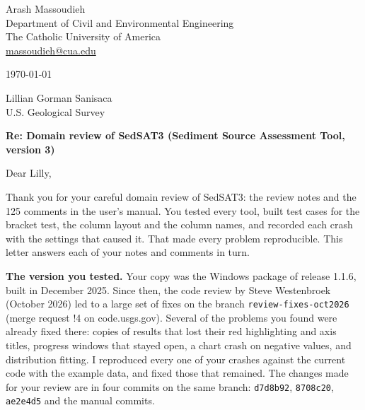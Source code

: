 \documentclass[11pt]{article}
\newcommand{\code}[1]{\texttt{#1}}
\newcommand{\commit}[1]{\texttt{#1}}
\begin{document}
\sloppy
\setlength{\emergencystretch}{3em}

\begin{flushleft}
Arash Massoudieh\\
Department of Civil and Environmental Engineering\\
The Catholic University of America\\
\href{mailto:massoudieh@cua.edu}{massoudieh@cua.edu}

\medskip
\today

\medskip
Lillian Gorman Sanisaca\\
U.S. Geological Survey
\end{flushleft}

\textbf{Re: Domain review of SedSAT3 (Sediment Source Assessment Tool, version 3)}

Dear Lilly,

Thank you for your careful domain review of SedSAT3: the review notes and the
125 comments in the user's manual. You tested every tool, built test cases for
the bracket test, the column layout and the column names, and recorded each
crash with the settings that caused it. That made every problem reproducible.
This letter answers each of your notes and comments in turn.

\textbf{The version you tested.} Your copy was the Windows package of release
1.1.6, built in December 2025. Since then, the code review by Steve Westenbroek
(October 2026) led to a large set of fixes on the branch
\code{review-fixes-oct2026} (merge request !4 on code.usgs.gov). Several of the
problems you found were already fixed there: copies of results that lost their
red highlighting and axis titles, progress windows that stayed open, a chart
crash on negative values, and distribution fitting. I reproduced every one of
your crashes against the current code with the example data, and fixed those
that remained. The changes made for your review are in four commits on the
same branch: \commit{d7d8b92}, \commit{8708c20}, \commit{ae2e4d5} and the
manual commits.
\end{document}
